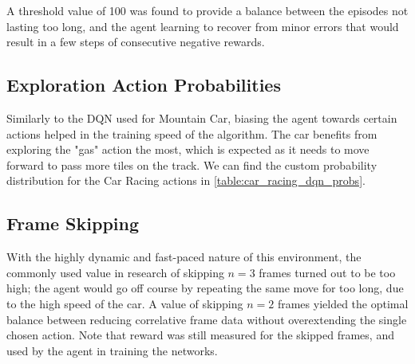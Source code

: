 A threshold value of 100 was found to provide a balance between the episodes
not lasting too long, and the agent learning to recover from minor errors that
would result in a few steps of consecutive negative rewards.

\subsection{Exploration Action Probabilities}
Similarly to the DQN used for Mountain Car, biasing the agent towards certain
actions helped in the training speed of the algorithm. The car benefits from
exploring the "gas" action the most, which is expected as it needs to move
forward to pass more tiles on the track. We can find the custom probability
distribution for the Car Racing actions in
\autoref{table:car_racing_dqn_probs}.



\subsection{Frame Skipping}
With the highly dynamic and fast-paced nature of this environment, the commonly
used value in research of skipping $n = 3$ frames \cite{bellemare2013arcade}
turned out to be too high; the agent would go off course by repeating the same
move for too long, due to the high speed of the car. A value of skipping $n =
  2$ frames yielded the optimal balance between reducing correlative frame data
without overextending the single chosen action. Note that reward was still
measured for the skipped frames, and used by the agent in training the
networks.
